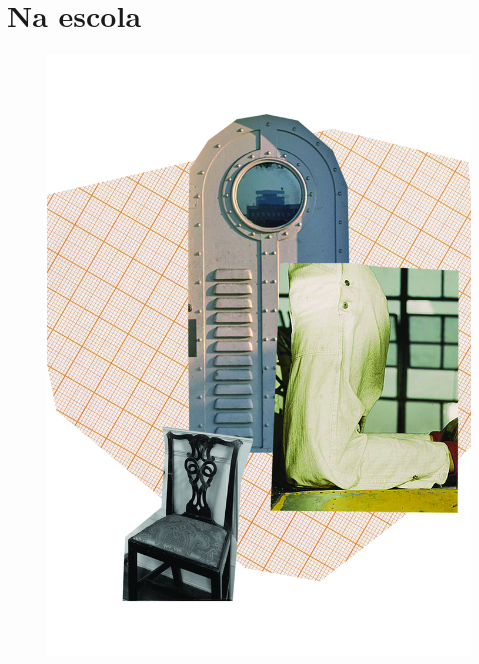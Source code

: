 
\part{Na escola}

\pagebreak
\thispagestyle{empty}
\begin{figure}
\vspace*{-.5cm}
\hspace*{-2.3cm}\includegraphics[width=140mm]{../ilustracoes/01_RAPOSO.jpg}
\end{figure}
\pagebreak

